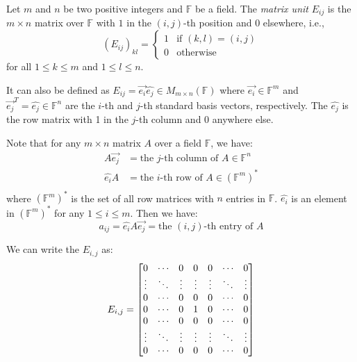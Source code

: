 \documentclass[
	11pt, %
	fleqn, %
	a4paper, %
]{LegrandOrangeBook}
\newcommand{\F}{\mathbb{F}} %
\newcommand{\mypoint}[2]{\tikz[remember picture]{\node[inner sep=0, anchor=base](#1){$#2$};}}
\begin{document}
\begin{definition}
    Let $m$ and $n$ be two positive integers and $\F$ be a field. The \emph{matrix unit} $E_{ij}$ is the $m \times n$ matrix over $\F$ with $1$ in the $(i,j)$-th position and $0$ elsewhere, i.e.,
    \[
        (E_{ij})_{kl} = \begin{cases}
            1 & \text{if } (k,l) = (i,j) \\
            0 & \text{otherwise}
        \end{cases}
    \]
    for all $1 \leq k \leq m$ and $1 \leq l \leq n$.

    It can also be defined as $E_{ij} = \vec{e_i} \hat{e_j} \in M_{m \times n} (\F)$ where $\vec{e_i} \in \F^m$ and $\vec{e_j}^T = \hat{e_j} \in \F^n$ are the $i$-th and $j$-th standard basis vectors, respectively. The $\hat{e_j}$ is the row matrix with 1 in the $j$-th column and 0 anywhere else.
\end{definition}

\begin{remark}
    Note that for any $m \times n$ matrix $A$ over a field $\F$, we have:
    \[
        \begin{split}
            A\vec{e_j} &= \text{the } j\text{-th column of } A \in \F^n \\
            \hat{e_i}A &= \text{the } i\text{-th row of } A \in (\F^m)^* \\
        \end{split}
    \]
    where $(\F^m)^*$ is the set of all row matrices with $n$ entries in $\F$. $\hat{e_i}$ is an element in $(\F^m)^*$ for any $1 \leq i \leq m$. Then we have:
    \[
        a_{ij} = \hat{e_i} A \vec{e_j} = \text{the } (i,j)\text{-th entry of } A
    \]
\end{remark}

We can write the $E_{i,j}$ as:
\vspace{7ex}
\[
    E_{i,j} = \begin{bmatrix}
        0 & \cdots & 0 & \mypoint{herei}{0} & 0 & \cdots & 0 \\
        \vdots & \ddots & \vdots & \vdots & \vdots & \ddots & \vdots \\
        0 & \cdots & 0 & 0 & 0 & \cdots & 0 \\
        0 & \cdots & 0 & 1 & 0 & \cdots & \mypoint{herej}{0} \\
        0 & \cdots & 0 & 0 & 0 & \cdots & 0 \\
        \vdots & \ddots & \vdots & \vdots & \vdots & \ddots & \vdots \\
        0 & \cdots & 0 & 0 & 0 & \cdots & 0 \\
    \end{bmatrix}
\]
\end{document}

